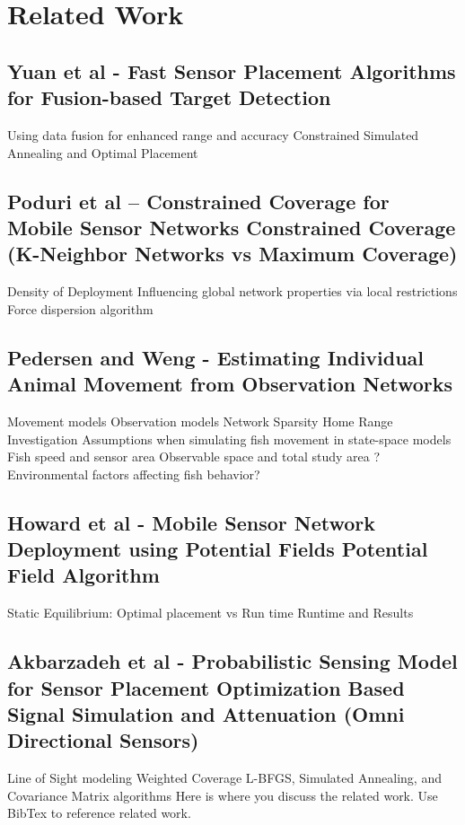 \chapter{Related Work}

\section{Yuan et al - Fast Sensor Placement Algorithms for Fusion-based Target Detection}
Using data fusion for enhanced range and accuracy
Constrained Simulated Annealing and Optimal Placement

\section{Poduri et al – Constrained Coverage for Mobile Sensor Networks Constrained Coverage (K-Neighbor Networks vs Maximum Coverage)}
Density of Deployment
Influencing global network properties via local restrictions
Force dispersion algorithm 

\section{Pedersen and Weng - Estimating Individual Animal Movement from Observation Networks}
Movement models
Observation models
Network Sparsity
Home Range Investigation
Assumptions when simulating fish movement in state-space models
Fish speed and sensor area
Observable space and total study area
?Environmental factors affecting fish behavior?

\section{Howard et al - Mobile Sensor Network Deployment using Potential Fields Potential Field Algorithm}
Static Equilibrium: Optimal placement vs Run time
Runtime and Results

\section{Akbarzadeh et al - Probabilistic Sensing Model for Sensor Placement Optimization Based Signal Simulation and Attenuation (Omni Directional Sensors)}
Line of Sight modeling
Weighted Coverage
L-BFGS, Simulated Annealing, and Covariance Matrix algorithms
Here is where you discuss the related work. Use BibTex to reference related work.

